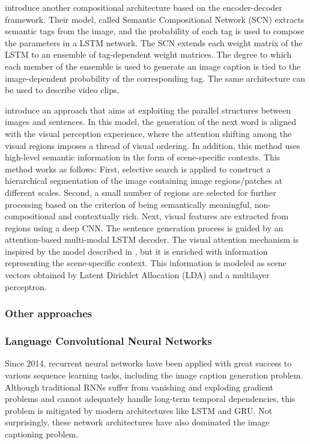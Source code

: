 \citet{Gan2017_SCN} introduce another compositional architecture based on the encoder-decoder framework. Their model, called Semantic Compositional Network (SCN) extracts semantic tags from the image, and the probability of each tag is used to compose the parameters in a LSTM network. The SCN extends each weight matrix of the LSTM to an ensemble of tag-dependent weight matrices. The degree to which each member of the ensemble is used to generate an image caption is tied to the image-dependent probability of the corresponding tag. The same architecture can be used to describe video clips.

\citet{Fu2017} introduce an approach that aims at exploiting the parallel structures between images and sentences. In this model, the generation of the next word is aligned with the visual perception experience, where the attention shifting among the visual regions imposes a thread of visual ordering. In addition, this method uses high-level semantic information in the form of scene-specific contexts. This method works as follows: First, selective search \citep{Uijlings2013} is applied to construct a hierarchical segmentation of the image containing image regions/patches at different scales. Second, a small number of regions are selected for further processing based on the criterion of being semantically meaningful, non-compositional and contextually rich. Next, visual features are extracted from regions using a deep CNN. The sentence generation process is guided by an attention-based multi-modal LSTM decoder. The visual attention mechanism is inspired by the model described in \citep{Xu2015}, but it is enriched with information representing the scene-specific context. This information is modeled as scene vectors obtained by Latent Dirichlet Allocation (LDA) \citep{Blei2003} and a multilayer perceptron.

\subsubsection{Other approaches}

\subsubsection{Language Convolutional Neural Networks}

Since 2014, recurrent neural networks have been applied with great success to various sequence learning tasks, including the image caption generation problem. Although traditional RNNs suffer from vanishing and exploding gradient problems and cannot adequately handle long-term temporal dependencies, this problem is mitigated by modern architectures like LSTM \cite{Hochreiter1997} and GRU\citep{Chung2014}. Not surprisingly, these network architectures have also dominated the image captioning problem. 

